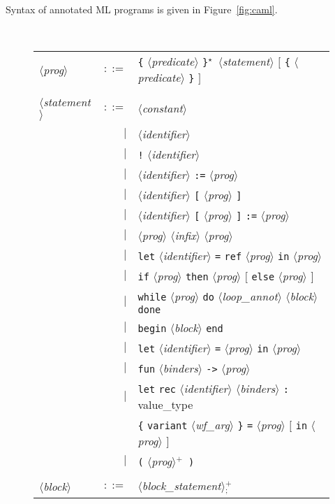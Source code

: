 \documentclass[a4paper,12pt]{report}
\newcommand{\te}[1]{\texttt{#1}}
\newcommand{\nt}[1]{$\langle$\textsl{#1}$\rangle$}
\newcommand{\etoile}{$^{\star}$}
\newcommand{\plus}{$^+$}
\newcommand{\plussep}[1]{$^+_#1$}
\begin{document}
Syntax of annotated ML programs is given in Figure~\ref{fig:caml}.
\begin{figure}[htbp]
\begin{center}
\hrulefill\\
\begin{tabular}{lrl}
  \nt{prog} 
    & $::=$ & \te{\{} \nt{predicate} \te{\}}\etoile\
              \nt{statement} 
              $[$ \te{\{} \nt{predicate} \te{\}} $]$ \\

       & & \\[0.1em]

  \nt{statement}
    & $::=$ & \nt{constant} \\
      & $|$ & \nt{identifier} \\
      & $|$ & \te{!} \nt{identifier} \\
      & $|$ & \nt{identifier} \te{:=} \nt{prog} \\
      & $|$ & \nt{identifier} \te{[} \nt{prog} \te{]} \\
      & $|$ & \nt{identifier} \te{[} \nt{prog} \te{]} \te{:=} \nt{prog} \\
      & $|$ & \nt{prog} \nt{infix} \nt{prog} \\
      & $|$ & \te{let} \nt{identifier} \te{=} \te{ref} 
              \nt{prog} \te{in} \nt{prog} \\
      & $|$ & \te{if} \nt{prog} \te{then} \nt{prog}
              $[$ \te{else} \nt{prog} $]$ \\
      & $|$ & \te{while} \nt{prog} \te{do}
              \nt{loop\_annot} \nt{block} \te{done} \\
      & $|$ & \te{begin} \nt{block} \te{end} \\
      & $|$ & \te{let} \nt{identifier} \te{=} \nt{prog} 
              \te{in} \nt{prog} \\
      & $|$ & \te{fun} \nt{binders} \te{->} \nt{prog} \\
      & $|$ & \te{let} \te{rec} \nt{identifier} \nt{binders} \te{:}
              value\_type \\
      &     & \te{\{} \te{variant} \nt{wf\_arg} \te{\}}
              \te{=} \nt{prog} $[$ \te{in} \nt{prog} $]$ \\
      & $|$ & \te{(} \nt{prog}\plus\  \te{)} \\

      & & \\[0.1em]

  \nt{block} 
    & $::=$ & \nt{block\_statement}\plussep{\te{;}} \\


\end{tabular}
\end{center}
\end{figure}
\end{document}
